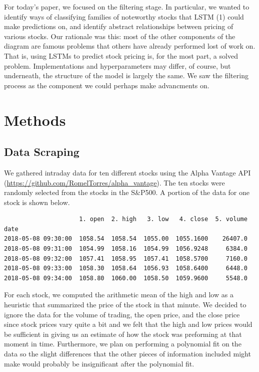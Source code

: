 \documentclass[final]{article}
\begin{document}
For today's paper, we focused on the filtering stage. In particular,
we wanted to identify ways of classifying families of noteworthy
stocks that LSTM (1) could make predictions on, and identify abstract
relationships between pricing of various stocks. Our rationale was
this: most of the other components of the diagram are famous problems
that others have already performed lost of work on. That is, using
LSTMs to predict stock pricing is, for the most part, a solved
problem. Implementations and hyperparameters may differ, of course,
but underneath, the structure of the model is largely the same. We saw
the filtering process as the component we could perhaps make
advancments on.
\section{Methods}

\subsection{Data Scraping}
We gathered intraday data for ten different stocks using the Alpha Vantage API
(\url{https://github.com/RomelTorres/alpha_vantage}). The ten stocks were
randomly selected from the stocks in the S\&P500. A portion of the data for one
stock is shown below.

\begin{verbatim}
                     1. open  2. high   3. low   4. close  5. volume
date
2018-05-08 09:30:00  1058.54  1058.54  1055.00  1055.1600    26407.0
2018-05-08 09:31:00  1054.99  1058.16  1054.99  1056.9248     6384.0
2018-05-08 09:32:00  1057.41  1058.95  1057.41  1058.5700     7160.0
2018-05-08 09:33:00  1058.30  1058.64  1056.93  1058.6400     6448.0
2018-05-08 09:34:00  1058.80  1060.00  1058.50  1059.9600     5548.0
\end{verbatim}

For each stock, we computed the arithmetic mean of the high and low as a
heuristic that summarized the price of the stock in that minute. We decided to
ignore the data for the volume of trading, the open price, and the close price
since stock prices vary quite a bit and we felt that the high and low prices
would be sufficient in giving us an estimate of how the stock was preforming at
that moment in time. Furthermore, we plan on performing a polynomial fit on the
data so the slight differences that the other pieces of information included
might make would probably be insignificant after the polynomial fit.
\end{document}
